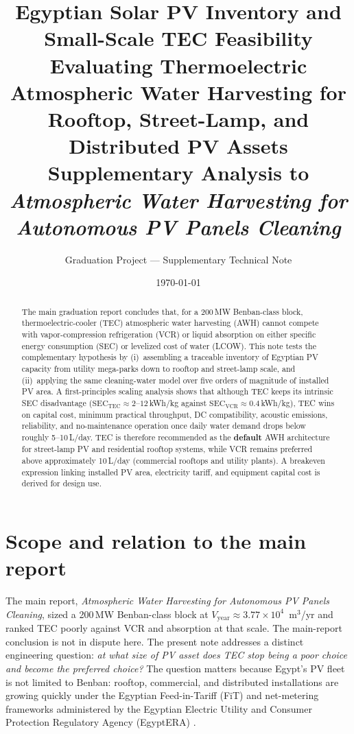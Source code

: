 \documentclass[11pt,a4paper]{article}
\title{\textbf{Egyptian Solar PV Inventory and Small-Scale TEC Feasibility}\\[0.35em]
\large Evaluating Thermoelectric Atmospheric Water Harvesting for Rooftop, Street-Lamp, and Distributed PV Assets\\[0.25em]
\normalsize Supplementary Analysis to \textit{Atmospheric Water Harvesting for Autonomous PV Panels Cleaning}}
\author{Graduation Project --- Supplementary Technical Note}
\date{\today}
\begin{document}
\maketitle

\begin{abstract}
\noindent
The main graduation report concludes that, for a 200\,MW Benban-class block, thermoelectric-cooler (TEC) atmospheric water harvesting (AWH) cannot compete with vapor-compression refrigeration (VCR) or liquid absorption on either specific energy consumption (SEC) or levelized cost of water (LCOW). This note tests the complementary hypothesis by (i)~assembling a traceable inventory of Egyptian PV capacity from utility mega-parks down to rooftop and street-lamp scale, and (ii)~applying the same cleaning-water model over five orders of magnitude of installed PV area. A first-principles scaling analysis shows that although TEC keeps its intrinsic SEC disadvantage ($\mathrm{SEC}_{\mathrm{TEC}}\approx 2\text{--}12$\,kWh/kg against $\mathrm{SEC}_{\mathrm{VCR}}\approx 0.4$\,kWh/kg), TEC wins on capital cost, minimum practical throughput, DC compatibility, acoustic emissions, reliability, and no-maintenance operation once daily water demand drops below roughly 5--10\,L/day. TEC is therefore recommended as the \textbf{default} AWH architecture for street-lamp PV and residential rooftop systems, while VCR remains preferred above approximately 10\,L/day (commercial rooftops and utility plants). A breakeven expression linking installed PV area, electricity tariff, and equipment capital cost is derived for design use.
\end{abstract}

\tableofcontents
\newpage

\section{Scope and relation to the main report}
The main report, \textit{Atmospheric Water Harvesting for Autonomous PV Panels Cleaning}, sized a 200\,MW Benban-class block at $V_{\mathrm{year}}\approx 3.77\times 10^{4}$~m$^3$/yr and ranked TEC poorly against VCR and absorption at that scale. The main-report conclusion is not in dispute here. The present note addresses a distinct engineering question: \emph{at what size of PV asset does TEC stop being a poor choice and become the preferred choice?} The question matters because Egypt's PV fleet is not limited to Benban: rooftop, commercial, and distributed installations are growing quickly under the Egyptian Feed-in-Tariff (FiT) and net-metering frameworks administered by the Egyptian Electric Utility and Consumer Protection Regulatory Agency (EgyptERA) \cite{ieeeref_egyptera}.
\end{document}
